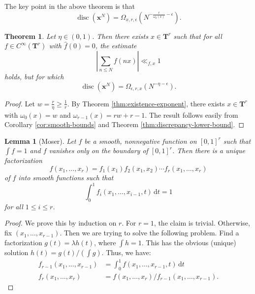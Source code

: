 \documentclass{article}
\DeclareMathOperator{\disc}{disc}
\newcommand{\bT}{\mathbf{T}}
\newcommand{\bx}{{\boldsymbol x}}
\newcommand{\dd}{\mathrm{d}}
\newtheorem{theorem}[subsection]{Theorem}
\newtheorem{lemma}[subsection]{Lemma}
\theoremstyle{definition}
\begin{document}
The key point in the above theorem is that 
\[
	\disc(\bx^N) = \Omega_{x,r,\epsilon}\left(N^{-\frac{r}{\omega_0(x)}-\epsilon}\right) .
\]

\begin{theorem}\label{thm:fast-decay}
Let $\eta\in (0,1)$. Then there exists $x\in \bT^r$ such that for all 
$f\in C^\infty(\bT^r)$ with $\widehat f(0)=0$, the estimate 
\[
	\left| \sum_{n\leqslant N} f(n x)\right|\ll_{f,x} 1
\]
holds, but for which 
\[
	\disc(\bx^N) = \Omega_{\epsilon,r,x}\left(N^{-\eta - \epsilon}\right) .
\]
\end{theorem}
\begin{proof}
Let $w=\frac{r}{\eta} \geqslant \frac 1 r$. By 
Theorem \ref{thm:existence-exponent}, there exists $x\in \bT^r$ with 
$\omega_0(x)=w$ and $\omega_{r-1}(x)=r w+r-1$. The result follows easily 
from Corollary \ref{cor:smooth-bounds} and Theorem \ref{thm:discrepancy-lower-bound}. 
\end{proof}

\begin{lemma}[Moser]\label{lem:factorization}
Let $f$ be a smooth, nonnegative function on $[0,1]^r$ such that $\int f=1$ and 
$f$ vanishes only on the boundary of $[0,1]^r$. Then there is a unique 
factorization 
\[
	f(x_1,\dots,x_r) = f_1(x_1) f_2(x_1,x_2) \dotsm f_r(x_1,\dots,x_r)
\]
of $f$ into smooth functions such that 
\[
	\int_0^1 f_i(x_1,\dots,x_{i-1},t)\, \dd t = 1
\]
for all $1\leqslant i\leqslant r$. 
\end{lemma}
\begin{proof}
We prove this by induction on $r$. For $r=1$, the claim is trivial. Otherwise, 
fix $(x_1,\dots,x_{r-1})$. Then we are trying to solve the following problem. 
Find a factorization $g(t) = \lambda h(t)$, where $\int h=1$. This has the 
obvious (unique) solution $h(t) = g(t)/(\int g)$. Thus, we have:
\begin{align*}
	f_{r-1}(x_1,\dots,x_{r-1}) &= \int_0^1 f(x_1,\dots,x_{r-1},t)\, \dd t \\
	f_r(x_1,\dots,x_r) &= f(x_1,\dots,x_r) / f_{r-1}(x_1,\dots,x_{r-1}) .
\end{align*}
\end{proof}
\end{document}

